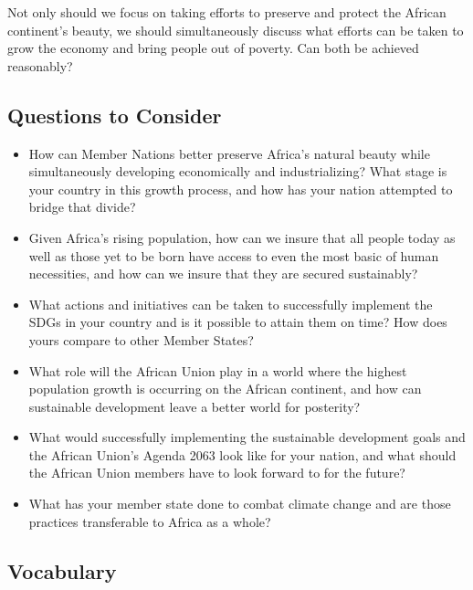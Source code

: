 \documentclass[10pt, letterpaper]{article}
\begin{document}
Not only should we focus on taking efforts to preserve and protect the
African continent's beauty, we should simultaneously discuss what
efforts can be taken to grow the economy and bring people out of
poverty. Can both be achieved reasonably? \\

\subsection{Questions to Consider}
\begin{itemize}
\item 
How can Member Nations better preserve Africa's natural beauty while
simultaneously developing economically and industrializing? What stage
is your country in this growth process, and how has your nation
attempted to bridge that divide? 

\item 
Given Africa's rising population, how can we insure that all people
today as well as those yet to be born have access to even the most basic
of human necessities, and how can we insure that they are secured
sustainably? 

\item 
What actions and initiatives can be taken to successfully implement the
SDGs in your country and is it possible to attain them on time? How does
yours compare to other Member States? 

\item 
What role will the African Union play in a world where the highest
population growth is occurring on the African continent, and how can
sustainable development leave a better world for posterity? 

\item 
What would successfully implementing the sustainable development goals
and the African Union's Agenda 2063 look like for your nation, and what
should the African Union members have to look forward to for the future? 

\item 
What has your member state done to combat climate change and are those
practices transferable to Africa as a whole? 
\end{itemize}

\subsection{Vocabulary} 
\end{document}
